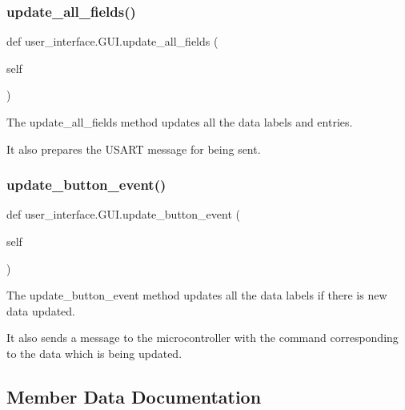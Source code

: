 \subsubsection{\texorpdfstring{update\+\_\+all\+\_\+fields()}{update\_all\_fields()}}
{\footnotesize\ttfamily def user\+\_\+interface.\+G\+U\+I.\+update\+\_\+all\+\_\+fields (\begin{DoxyParamCaption}\item[{}]{self }\end{DoxyParamCaption})}



The update\+\_\+all\+\_\+fields method updates all the data labels and entries. 

It also prepares the U\+S\+A\+RT message for being sent. \mbox{\label{classuser__interface_1_1GUI_a866b8e4bf0bc892cc6ae44a68041e006}} 
\subsubsection{\texorpdfstring{update\+\_\+button\+\_\+event()}{update\_button\_event()}}
{\footnotesize\ttfamily def user\+\_\+interface.\+G\+U\+I.\+update\+\_\+button\+\_\+event (\begin{DoxyParamCaption}\item[{}]{self }\end{DoxyParamCaption})}



The update\+\_\+button\+\_\+event method updates all the data labels if there is new data updated. 

It also sends a message to the microcontroller with the command corresponding to the data which is being updated. 

\subsection{Member Data Documentation}
\mbox{\label{classuser__interface_1_1GUI_af53b0ba0804ffdcc87b9511efece0489}} 
